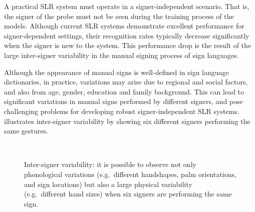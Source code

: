 A practical SLR system must operate in a signer-independent scenario. That is, the signer of the probe must not be seen during the training process of the models. Although current SLR systems demonstrate excellent performance for signer-dependent settings, their recognition rates typically decrease significantly when the signer is new to the system. This performance drop is the result of the large inter-signer variability in the manual signing process of sign languages.

Although the appearance of manual signs is well-defined in sign language dictionaries, in practice, variations may arise due to regional and social factors, and also from age, gender, education and family background. This can lead to significant variations in manual signs performed by different signers, and pose challenging problems for developing robust signer-independent SLR systems.  illustrates inter-signer variability by showing six different signers performing the same gestures.

\begin{figure}[t]
    \centering
    \hfill
    \hfill
    \\\vspace{0.4cm}
    \hfill
    \hfill
    \caption{Inter-signer variability: it is possible to observe not only phonological variations (e.g.\ different handshapes, palm orientations, and sign locations) but also a large physical variability (e.g.\ different hand sizes) when six signers are performing the same sign.}
    \label{fig:inter_signer_variations}
\end{figure}

